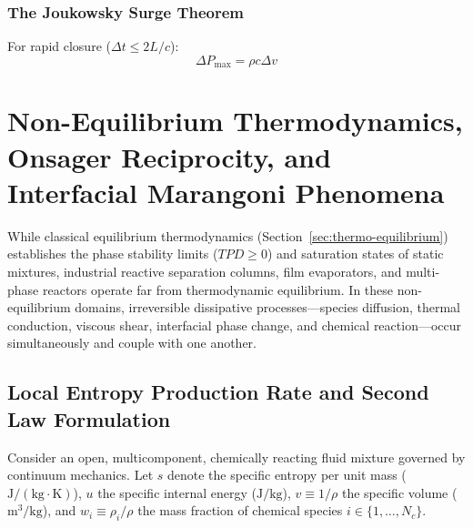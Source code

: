 \documentclass[11pt,a4paper]{article}
\begin{document}
\subsubsection{The Joukowsky Surge Theorem}
For rapid closure ($\Delta t \le 2 L / c$):
\begin{equation}
\Delta P_{\text{max}} = \rho c \Delta v
\end{equation}

\section{Non-Equilibrium Thermodynamics, Onsager Reciprocity, and Interfacial Marangoni Phenomena}
\label{sec:non-equilibrium-thermodynamics}

While classical equilibrium thermodynamics (Section~\ref{sec:thermo-equilibrium}) establishes the phase stability limits ($TPD \ge 0$) and saturation states of static mixtures, industrial reactive separation columns, film evaporators, and multi-phase reactors operate far from thermodynamic equilibrium. In these non-equilibrium domains, irreversible dissipative processes---species diffusion, thermal conduction, viscous shear, interfacial phase change, and chemical reaction---occur simultaneously and couple with one another.

\subsection{Local Entropy Production Rate and Second Law Formulation}
\label{subsec:local-entropy-production}

Consider an open, multicomponent, chemically reacting fluid mixture governed by continuum mechanics. Let $s$ denote the specific entropy per unit mass ($\text{J}/(\text{kg}\cdot\text{K})$), $u$ the specific internal energy ($\text{J}/\text{kg}$), $v \equiv 1/\rho$ the specific volume ($\text{m}^3/\text{kg}$), and $w_i \equiv \rho_i / \rho$ the mass fraction of chemical species $i \in \{1, \dots, N_c\}$.
\end{document}
